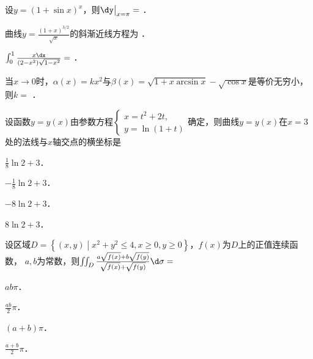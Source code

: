 \documentclass[plain,noanswer,medmath]{../../template/jnuexam}
\begin{document}






\begin{problem}
设$y = (1 + \sin x)^x$，则$\dy\big|_{x = \pi} =$ \fillin{}．
\end{problem}


\begin{problem}
曲线$y = \frac{(1 + x)^{3/2}}{\sqrt{x}}$的斜渐近线方程为 \fillin{}．
\end{problem}


\begin{problem}
$\int_0^1 \frac{x\dx}{(2 - x^2)\sqrt{1 - x^2}} =$ \fillin{}．
\end{problem}




\begin{problem}
当$x \to 0$时，$\alpha (x) = kx^2$与$\beta (x) = \sqrt{1 + x\arcsin x} - \sqrt{\cos x}$是等价无穷小，
则$k =$ \fillin{}．
\end{problem}










\begin{problem}
设函数$y = y(x)$由参数方程$\begin{cases}
  x = t^2 + 2t, \\
  y = \ln(1 + t)
\end{cases}$确定，则曲线$y = y(x)$在$x = 3$处的法线与$x$轴交点的横坐标是\pickout{}
\begin{abcd}
\item $\frac{1}{8}\ln 2 + 3$．
\item $- \frac{1}{8}\ln 2 + 3$．
\item $- 8\ln 2 + 3$．
\item $8\ln 2 + 3$．
\end{abcd}
\end{problem}


\begin{problem}
设区域$D = \left\{(x,y) \middle| x^2 + y^2 \le 4,x \ge 0,y \ge 0 \right\}$，$f(x)$为$D$上的正值连续函数，
$a,b$为常数，则$\iint_D \frac{a\sqrt{f(x)} + b\sqrt{f(y)}}{\sqrt{f(x)} + \sqrt{f(y)}} \d\sigma=$\pickout{}
\begin{abcd}
\item $ab\pi$．
\item $\frac{ab}{2}\pi$．
\item $(a + b)\pi$．
\item $\frac{a + b}{2}\pi$．
\end{abcd}
\end{problem}
\end{document}
